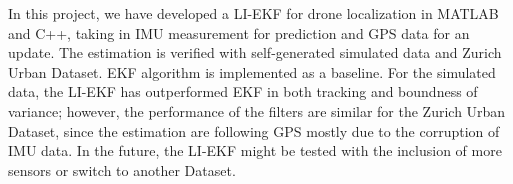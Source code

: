 In this project, we have developed a LI-EKF for drone localization in MATLAB and C++, taking in IMU measurement for prediction and GPS data for an update. The estimation is verified with self-generated simulated data and Zurich Urban Dataset. EKF algorithm is implemented as a baseline. For the simulated data, the LI-EKF has outperformed EKF in both tracking and boundness of variance; however, the performance of the filters are similar for the Zurich Urban Dataset, since the estimation are following GPS mostly due to the corruption of IMU data. In the future, the LI-EKF might be tested with the inclusion of more sensors or switch to another Dataset.